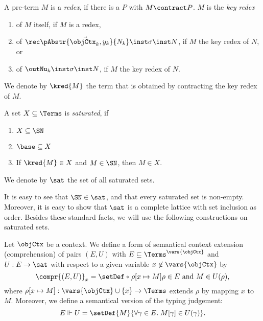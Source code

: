 \documentclass[preprint]{sigplanconf}
\begin{document}
\begin{definition}
  A pre-term $M$ is a \emph{redex}, if there is a $P$ with $M \contract P$.
  $M$ is the \emph{key redex}
  \begin{enumerate}
  \item of $M$ itself, if $M$ is a redex,
  \item of $\rec \vec{\pAbstr{\objCtx_k, y_k}{N_k}} \inst \sigma \inst N$,
    if $M$ the key redex of $N$, or
  \item of $\outNu_k \inst \sigma \inst N$,
    if $M$ the key redex of $N$.
  \end{enumerate}
  We denote by $\kred{M}$ the term that is obtained by contracting the key
  redex of $M$.
\end{definition}

\begin{definition}
  A set $X \subseteq \Terms$ is \emph{saturated}, if
  \begin{enumerate}
  \item $X \subseteq \SN$
  \item $\base \subseteq X$
  \item If $\kred{M} \in X$ and $M \in \SN$, then $M \in X$.
  \end{enumerate}
  We denote by $\sat$ the set of all saturated sets.
\end{definition}

It is easy to see that $\SN \in \sat$, and that every saturated set is
non-empty. Moreover, it is easy to show that $\sat$ is a complete
lattice with set inclusion as order.
Besides these standard facts, we will use the following constructions
on saturated sets.

\begin{definition}
  Let $\objCtx$ be a context.
  We define a form of semantical context extension (comprehension)
  of pairs $(E, U)$ with $E \subseteq \Terms^{\vars{\objCtx}}$ and
  $U : E \to \sat$ with respect to a given variable $x \not\in \vars{\objCtx}$
  by
  \begin{equation}
    \label{eq:sat-comprehension}
    \compr{(E, U)}_{x} =
    \setDef*{\rho[x \mapsto M]}{
      \rho \in E \text{ and }
      M \in U(\rho)},
  \end{equation}
  where $\rho[x \mapsto M] : \vars{\objCtx} \cup \{x\} \to \Terms$
  extends $\rho$ by mapping $x$ to $M$.
  Moreover, we define a semantical version of the typing judgement:
  \begin{equation}
    \label{eq:sat-typing}
    E \Vdash U = \setDef{M}{\forall \gamma \in E. \; M[\gamma] \in U(\gamma)}.
  \end{equation}
\end{definition}
\end{document}
